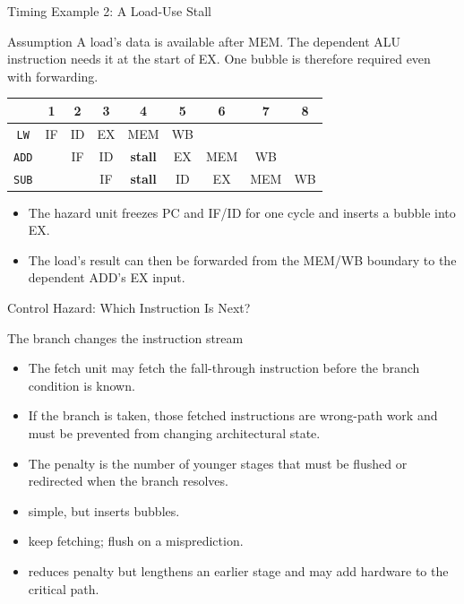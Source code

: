 \documentclass[aspectratio=169]{beamer}
\begin{document}
\begin{frame}{Timing Example 2: A Load-Use Stall}
  \scriptsize
  \begin{exampleblock}{Assumption}
    A load's data is available after MEM. The dependent ALU instruction needs
    it at the start of EX. One bubble is therefore required even with forwarding.
  \end{exampleblock}
  \begin{center}
    \begin{tabular}{@{}c|cccccccc@{}}
      \toprule
      & 1 & 2 & 3 & 4 & 5 & 6 & 7 & 8 \\
      \midrule
      \texttt{LW}  & IF & ID & EX & MEM & WB & & & \\
      \texttt{ADD} & & IF & ID & \textbf{stall} & EX & MEM & WB & \\
      \texttt{SUB} & & & IF & \textbf{stall} & ID & EX & MEM & WB \\
      \bottomrule
    \end{tabular}
  \end{center}
  \begin{itemize}
    \item The hazard unit freezes PC and IF/ID for one cycle and inserts a
      bubble into EX.
    \item The load's result can then be forwarded from the MEM/WB boundary to
      the dependent ADD's EX input.
  \end{itemize}
\end{frame}

\begin{frame}{Control Hazard: Which Instruction Is Next?}
  \begin{block}{The branch changes the instruction stream}
    \begin{itemize}
      \item The fetch unit may fetch the fall-through instruction before the
        branch condition is known.
      \item If the branch is taken, those fetched instructions are wrong-path
        work and must be prevented from changing architectural state.
      \item The penalty is the number of younger stages that must be flushed
        or redirected when the branch resolves.
    \end{itemize}
  \end{block}
  \begin{itemize}
    \item {} simple, but inserts bubbles.
    \item {} keep fetching; flush on a misprediction.
    \item {} reduces penalty but lengthens
      an earlier stage and may add hardware to the critical path.
  \end{itemize}
\end{frame}
\end{document}
